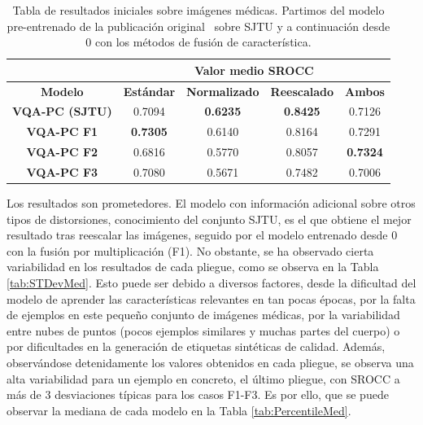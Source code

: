 \begin{table}[htp]
  \scriptsize
  \centering
\begin{tabular}{|c|cccc|}
\hline
\rowcolor[HTML]{FFC702}
                       & \multicolumn{4}{c|}{\textbf{Valor medio SROCC}}                                                                                                    \\ \hline
\rowcolor[HTML]{FFC702}
\textbf{Modelo}        & \multicolumn{1}{c|}{\textbf{Estándar}} & \multicolumn{1}{c|}{\textbf{Normalizado}} & \multicolumn{1}{c|}{\textbf{Reescalado}} & \textbf{Ambos}  \\ \hline
\textbf{VQA-PC (SJTU)} & \multicolumn{1}{c|}{0.7094}            & \multicolumn{1}{c|}{\textbf{0.6235}}      & \multicolumn{1}{c|}{\textbf{0.8425}}    & 0.7126          \\ \hline
\textbf{VQA-PC F1}     & \multicolumn{1}{c|}{\textbf{0.7305}}   & \multicolumn{1}{c|}{0.6140}               & \multicolumn{1}{c|}{0.8164}             & 0.7291          \\ \hline
\textbf{VQA-PC F2}     & \multicolumn{1}{c|}{0.6816}            & \multicolumn{1}{c|}{0.5770}               & \multicolumn{1}{c|}{0.8057}             & \textbf{0.7324} \\ \hline
\textbf{VQA-PC F3}     & \multicolumn{1}{c|}{0.7080}            & \multicolumn{1}{c|}{0.5671}      & \multicolumn{1}{c|}{0.7482}             & 0.7006          \\ \hline
\end{tabular}
\caption[Valor medio sobre imágenes médicas.]{Tabla de resultados iniciales sobre imágenes médicas. 
Partimos del modelo pre-entrenado de la publicación original~\cite{VQA-PC} sobre SJTU y 
a continuación desde 0 con los métodos de fusión de característica.
}
\label{tab:SroccMedRes}
\end{table}

Los resultados son prometedores. El modelo con información adicional sobre otros 
tipos de distorsiones, conocimiento del conjunto SJTU, es el que obtiene el mejor 
resultado tras reescalar las imágenes, seguido por el modelo entrenado desde 0 
con la fusión por multiplicación (F1). No obstante, se ha observado cierta 
variabilidad en los resultados de cada pliegue, como se observa en la Tabla \ref{tab:STDevMed}.
Esto puede ser debido a diversos factores, desde la dificultad del modelo de 
aprender las características relevantes en tan pocas épocas, por la falta 
de ejemplos en este pequeño conjunto de imágenes médicas, por la variabilidad 
entre nubes de puntos (pocos ejemplos similares y muchas partes del cuerpo) 
o por dificultades en la generación de etiquetas sintéticas de calidad. 
Además, observándose detenidamente los valores obtenidos en cada pliegue, 
se observa una alta variabilidad para un ejemplo en concreto, el último pliegue, 
con SROCC a más de 3 desviaciones típicas para los casos F1-F3.  Es por ello, 
que se puede observar la mediana de cada modelo en la Tabla \ref{tab:PercentileMed}.

